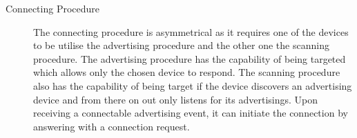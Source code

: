 \begin{description}
\item [Connecting Procedure] The connecting procedure is asymmetrical as it requires one of the devices to be utilise the advertising procedure and the other one the scanning procedure. The advertising procedure has the capability of being targeted which allows only the chosen device to respond.  The scanning procedure also has the capability of being target if the device discovers an advertising device and from there on out only listens for its advertisings. Upon receiving a connectable advertising event, it can initiate the connection by answering with a connection request.



\end{description}


